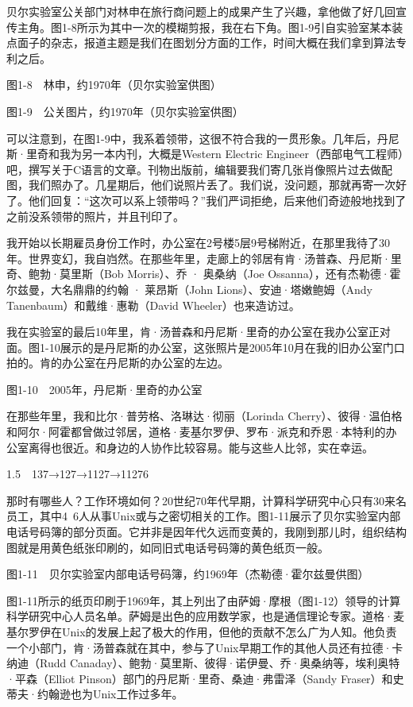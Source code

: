 \documentclass[a4paper,12pt,UTF8,twoside]{ctexbook}
\begin{document}
贝尔实验室公关部门对林申在旅行商问题上的成果产生了兴趣，拿他做了好几回宣传主角。图1-8所示为其中一次的模糊剪报，我在右下角。图1-9引自实验室某本装点面子的杂志，报道主题是我们在图划分方面的工作，时间大概在我们拿到算法专利之后。



图1-8　林申，约1970年（贝尔实验室供图）



图1-9　公关图片，约1970年（贝尔实验室供图）

可以注意到，在图1-9中，我系着领带，这很不符合我的一贯形象。几年后，丹尼斯·里奇和我为另一本内刊，大概是Western Electric Engineer（西部电气工程师）吧，撰写关于C语言的文章。刊物出版前，编辑要我们寄几张肖像照片过去做配图，我们照办了。几星期后，他们说照片丢了。我们说，没问题，那就再寄一次好了。他们回复：“这次可以系上领带吗？”我们严词拒绝，后来他们奇迹般地找到了之前没系领带的照片，并且刊印了。

我开始以长期雇员身份工作时，办公室在2号楼5层9号梯附近，在那里我待了30年。世界变幻，我自岿然。在那些年里，走廊上的邻居有肯·汤普森、丹尼斯·里奇、鲍勃·莫里斯（Bob Morris）、乔 · 奥桑纳（Joe Ossanna），还有杰勒德·霍尔兹曼，大名鼎鼎的约翰 · 莱昂斯（John Lions）、安迪·塔嫩鲍姆（Andy Tanenbaum）和戴维·惠勒（David Wheeler）也来造访过。

我在实验室的最后10年里，肯·汤普森和丹尼斯·里奇的办公室在我办公室正对面。图1-10展示的是丹尼斯的办公室，这张照片是2005年10月在我的旧办公室门口拍的。肯的办公室在丹尼斯的办公室的左边。



图1-10　2005年，丹尼斯·里奇的办公室

在那些年里，我和比尔·普劳格、洛琳达·彻丽（Lorinda Cherry）、彼得·温伯格和阿尔·阿霍都曾做过邻居，道格·麦基尔罗伊、罗布·派克和乔恩·本特利的办公室离得也很近。和身边的人协作比较容易。能与这些人比邻，实在幸运。





1.5　137→127→1127→11276


那时有哪些人？工作环境如何？20世纪70年代早期，计算科学研究中心只有30来名员工，其中4~6人从事Unix或与之密切相关的工作。图1-11展示了贝尔实验室内部电话号码簿的部分页面。它并非是因年代久远而变黄的，我刚到那儿时，组织结构图就是用黄色纸张印刷的，如同旧式电话号码簿的黄色纸页一般。



图1-11　贝尔实验室内部电话号码簿，约1969年（杰勒德·霍尔兹曼供图）

图1-11所示的纸页印刷于1969年，其上列出了由萨姆·摩根（图1-12）领导的计算科学研究中心人员名单。萨姆是出色的应用数学家，也是通信理论专家。道格·麦基尔罗伊在Unix的发展上起了极大的作用，但他的贡献不怎么广为人知。他负责一个小部门，肯·汤普森就在其中，参与了Unix早期工作的其他人员还有拉德·卡纳迪（Rudd Canaday）、鲍勃·莫里斯、彼得·诺伊曼、乔·奥桑纳等，埃利奥特·平森（Elliot Pinson）部门的丹尼斯·里奇、桑迪·弗雷泽（Sandy Fraser）和史蒂夫·约翰逊也为Unix工作过多年。
\end{document}

